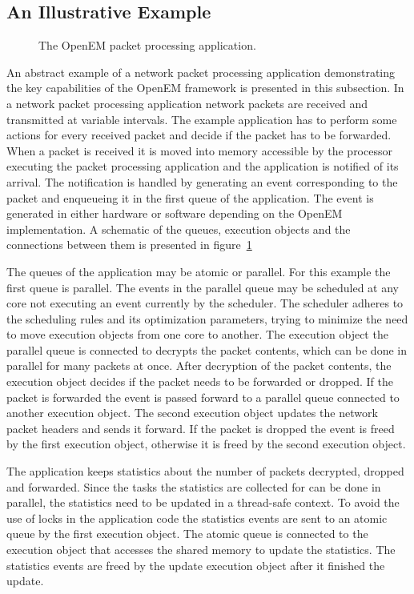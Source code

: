 \subsection{An Illustrative Example}
\label{subsec:example}
\begin{figure}[h!]
    \begin{center}
        
        \caption{The OpenEM packet processing application.}
        \label{fig:openem-example-flow}
    \end{center}
\end{figure}
An abstract example of a network packet processing application demonstrating the key capabilities of the OpenEM framework is presented in this subsection. In a network packet processing application network packets are received and transmitted at variable intervals. The example application has to perform some actions for every received packet and decide if the packet has to be forwarded. When a packet is received it is moved into memory accessible by the processor executing the packet processing application and the application is notified of its arrival. The notification is handled by generating an event corresponding to the packet and enqueueing it in the first queue of the application. The event is generated in either hardware or software depending on the OpenEM implementation. A schematic of the queues, execution objects and the connections between them is presented in figure~\ref{fig:openem-example-flow}

The queues of the application may be atomic or parallel. For this example the first queue is parallel. The events in the parallel queue may be scheduled at any core not executing an event currently by the scheduler. The scheduler adheres to the scheduling rules and its optimization parameters, trying to minimize the need to move execution objects from one core to another. The execution object the parallel queue is connected to decrypts the packet contents, which can be done in parallel for many packets at once. After decryption of the packet contents, the execution object decides if the packet needs to be forwarded or dropped. If the packet is forwarded the event is passed forward to a parallel queue connected to another execution object. The second execution object updates the network packet headers and sends it forward. If the packet is dropped the event is freed by the first execution object, otherwise it is freed by the second execution object.

The application keeps statistics about the number of packets decrypted, dropped and forwarded. Since the tasks the statistics are collected for can be done in parallel, the statistics need to be updated in a thread-safe context. To avoid the use of locks in the application code the statistics events are sent to an atomic queue by the first execution object. The atomic queue is connected to the execution object that accesses the shared memory to update the statistics. The statistics events are freed by the update execution object after it finished the update.
